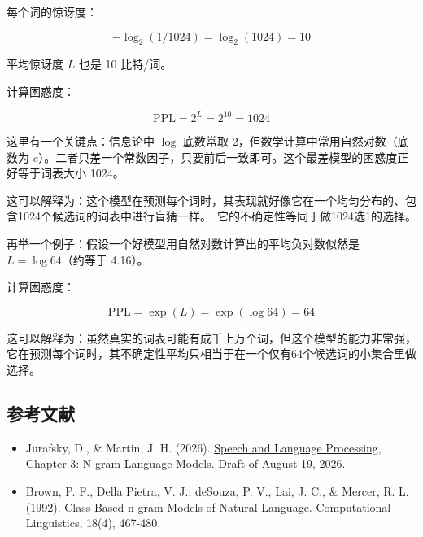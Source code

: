 每个词的惊讶度：

\[
-\log_2(1/1024)=\log_2(1024)=10
\]

平均惊讶度 \(L\) 也是 10 比特/词。

计算困惑度：

\[
\mathrm{PPL}=2^L=2^{10}=1024
\]

这里有一个关键点：信息论中 \(\log\) 底数常取 2，但数学计算中常用自然对数（底数为 \(e\)）。二者只差一个常数因子，只要前后一致即可。这个最差模型的困惑度正好等于词表大小 1024。

这可以解释为：这个模型在预测每个词时，其表现就好像它在一个均匀分布的、包含1024个候选词的词表中进行盲猜一样。~它的不确定性等同于做1024选1的选择。

再举一个例子：假设一个好模型用自然对数计算出的平均负对数似然是 \(L=\log 64\)（约等于 4.16）。

计算困惑度：

\[
\mathrm{PPL}=\exp(L)=\exp(\log 64)=64
\]

这可以解释为：虽然真实的词表可能有成千上万个词，但这个模型的能力非常强，它在预测每个词时，其不确定性平均只相当于在一个仅有64个候选词的小集合里做选择。

\hypertarget{ux53c2ux8003ux6587ux732e-108}{%
\subsection{参考文献}\label{ux53c2ux8003ux6587ux732e-108}}

\vspace{0.25em}
\begin{itemize}
\tightlist
\item
  Jurafsky, D., \& Martin, J. H. (2026). \href{https://web.stanford.edu/~jurafsky/slp3/3.pdf}{Speech and Language Processing, Chapter 3: N-gram Language Models}. Draft of August 19, 2026.
\item
  Brown, P. F., Della Pietra, V. J., deSouza, P. V., Lai, J. C., \& Mercer, R. L. (1992). \href{https://aclanthology.org/J92-4003/}{Class-Based n-gram Models of Natural Language}. Computational Linguistics, 18(4), 467-480.
\end{itemize}

\clearpage
